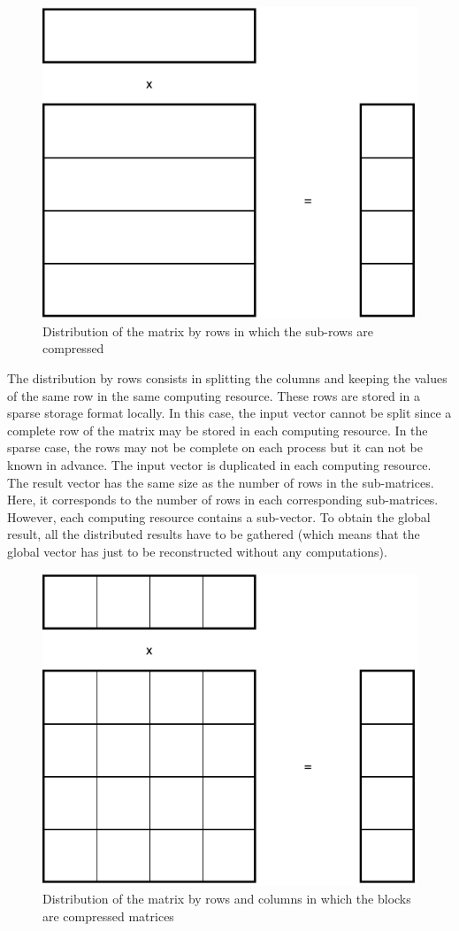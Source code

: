 \begin{figure}[h]
	\centering
	\includegraphics[width=.5\textwidth]{pmv_r}
	\caption{Distribution of the matrix by rows in which the sub-rows are compressed \label{fig:sparse:pmv_r}}
\end{figure}

The distribution by rows consists in splitting the columns and keeping the values of the same row in the same computing resource.
These rows are stored in a sparse storage format locally.
In this case, the input vector cannot be split since a complete row of the matrix may be stored in each computing resource.
In the sparse case, the rows may not be complete on each process but it can not be known in advance.
The input vector is duplicated in each computing resource.
The result vector has the same size as the number of rows in the sub-matrices.
Here, it corresponds to the number of rows in each corresponding sub-matrices.
However, each computing resource contains a sub-vector.
To obtain the global result, all the distributed results have to be gathered (which means that the global vector has just to be reconstructed without any computations).


\begin{figure}[h]
	\centering
	\includegraphics[width=.5\textwidth]{pmv_2D}
	\caption{Distribution of the matrix by rows and columns in which the blocks are compressed matrices \label{fig:sparse:pmv_2D}}
\end{figure}

